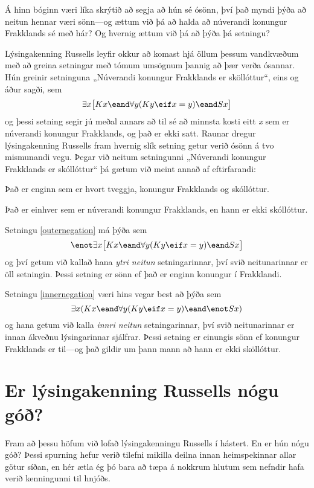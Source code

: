 Á hinn bóginn væri líka skrýtið að segja að hún sé ósönn, því það myndi þýða að neitun hennar væri sönn---og ættum við þá að halda að núverandi konungur Frakklands sé með hár? Og hvernig ættum við þá að þýða þá setningu? 

Lýsingakenning Russells leyfir okkur að komast hjá öllum þessum vandkvæðum með að greina setningar með tómum umsögnum þannig að þær verða ósannar. Hún greinir setninguna „Núverandi konungur Frakklands er sköllóttur“, eins og áður sagði, sem  $$\exists x \bigl[Kx \eand \forall y (Ky \eif x = y) \eand Sx\bigr]$$ og þessi setning segir jú meðal annars að til sé að minnsta kosti eitt \emph{x} sem er núverandi konungur Frakklands, og það er ekki satt. Raunar dregur lýsingakenning Russells fram hvernig slík setning getur verið ósönn á tvo mismunandi vegu. Þegar við neitum setningunni „Núverandi konungur Frakklands er skóllóttur“ þá gætum við meint annað af eftirfarandi:

	\begin{earg}
		\item[\ex{outernegation}] Það er enginn sem er hvort tveggja, konungur Frakklands og skóllóttur.
		\item[\ex{innernegation}] Það er einhver sem er núverandi konungur Frakklands, en hann er ekki skóllóttur.
	\end{earg}
Setningu \ref{outernegation} má þýða sem $$\enot \exists x\bigl[Kx \eand \forall y(Ky \eif  x = y) \eand Sx \bigr]$$ og því getum við kallað hana \emph{ytri neitun} setningarinnar, því svið neitunarinnar er öll setningin. Þessi setning er sönn ef það er enginn konungur í Frakklandi.

Setningu \ref{innernegation} væri hins vegar best að þýða sem $$\exists x (Kx \eand \forall y(Ky \eif x = y) \eand \enot Sx)$$ og hana getum við kalla \emph{innri neitun} setningarinnar, því svið neitunarinnar er innan ákveðnu lýsingarinnar sjálfrar. Þessi setning er einungis sönn ef konungur Frakklands er til---og það gildir um þann mann að hann er ekki sköllóttur.

\section{Er lýsingakenning Russells nógu góð?}

Fram að þessu höfum við lofað lýsingakenningu Russells í hástert. En er hún nógu góð? Þessi spurning hefur verið tilefni mikilla deilna innan heimspekinnar allar götur síðan, en hér ætla ég þó bara að tæpa á nokkrum hlutum sem nefndir hafa verið kenningunni til hnjóðs.

